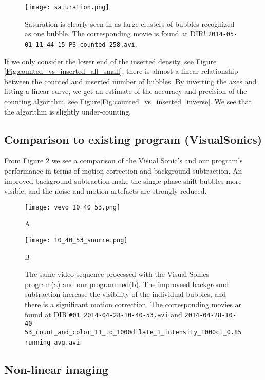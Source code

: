 \begin{figure}[h]
	\centering
	\texttt{[image: saturation.png]}
	 \cprotect\caption{Saturation is clearly seen in as large clusters of bubbles recognized as one bubble. The corresponding movie is found at DIR! \verb|2014-05-01-11-44-15_PS_counted_258.avi|.}
	\label{Fig:saturation}
\end{figure}

If we only consider the lower end of the inserted density, see  Figure \ref{Fig:counted_vs_inserted_all_small}, there is almost a linear relationship between the counted and inserted number of bubbles. By inverting the axes and fitting a linear curve, we get an estimate of the accuracy and precision of the counting algorithm, see Figure\ref{Fig:counted_vs_inserted_inverse}. We see that the algorithm is slightly under-counting. 


\subsection{Comparison to existing program (VisualSonics)}
From Figure \ref{Fig:compare VisualSonics} we see a comparison of the Visual Sonic's and our program's performance in terms of motion correction and background subtraction. An improved background subtraction make the single phase-shift bubbles more visible, and the noise and motion artefacts are strongly reduced.

\begin{figure}[h]
	\centering
	\begin{minipage}[b]{0.35\textwidth}
		\texttt{[image: vevo\_10\_40\_53.png]}
		\caption{A}
	\end{minipage}%
	\begin{minipage}[b]{0.3\textwidth}
		\texttt{[image: 10\_40\_53\_snorre.png]}
		\caption{B}
	\end{minipage}%
	 \cprotect\caption{The same video sequence processed with the Visual Sonics program(a) and our programmed(b). The improveed background subtraction increase the visibility of the individual bubbles, and there is a significant motion correction. The corresponding movies ar found at DIR!\verb|#01 2014-04-28-10-40-53.avi| and \verb|2014-04-28-10-40-53_count_and_color_11_to_1000dilate_1_intensity_1000ct_0.85running_avg.avi|.}
	\label{Fig:compare VisualSonics}
\end{figure}

\subsection{Non-linear imaging}
